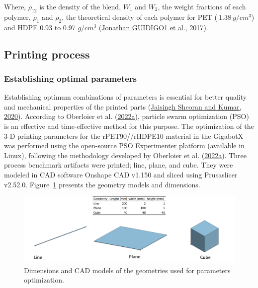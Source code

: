 \documentclass[
  12pt,
]{article}
\begin{document}
Where, \(\rho_{12}\) is the density of the blend, \(W_{1}\) and
\(W_{2}\), the weight fractions of each polymer, \(\rho_{1}\) and
\(\rho_{2}\), the theoretical density of each polymer for PET
(\(~1.38~g/cm^{3}\)) and HDPE 0.93 to 0.97 \(g/cm^{3}\)
(\protect\hyperlink{ref-jonathanguidigo12017}{Jonathan GUIDIGO1 et al.,
2017}).

\hypertarget{printing-process}{%
\subsection{Printing process}\label{printing-process}}

\hypertarget{establishing-optimal-parameters}{%
\subsubsection{Establishing optimal
parameters}\label{establishing-optimal-parameters}}

Establishing optimum combinations of parameters is essential for better
quality and mechanical properties of the printed parts
(\protect\hyperlink{ref-jaisinghsheoran2020}{Jaisingh Sheoran and Kumar,
2020}). According to Oberloier et al.
(\protect\hyperlink{ref-oberloier2022}{2022a}), particle swarm
optimization (PSO) is an effective and time-effective method for this
purpose. The optimization of the 3-D printing parameters for the
rPET90//rHDPE10 material in the GigabotX was performed using the
open-source PSO Experimenter platform (available in Linux), following
the methodology developed by Oberloier et al.
(\protect\hyperlink{ref-oberloier2022}{2022a}). Three process benchmark
artifacts were printed; line, plane, and cube. They were modeled in CAD
software Onshape CAD v1.150 and sliced using Prusaslicer v2.52.0.
Figure~\ref{fig-cad} presents the geometry models and dimensions.

\begin{figure}

{\centering \includegraphics{figures/Figure-2.png}

}

\caption{\label{fig-cad}Dimensions and CAD models of the geometries used
for parameters optimization.}

\end{figure}
\end{document}
